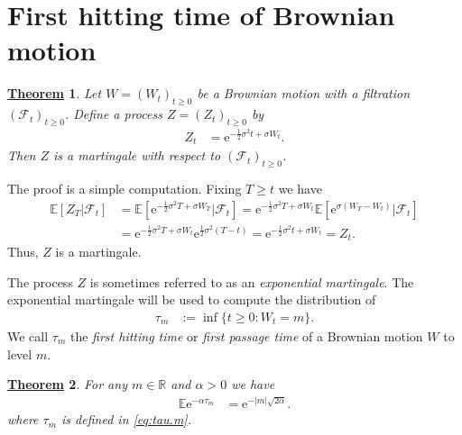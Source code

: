 \documentclass[12pt]{book}
\numberwithin{equation}{chapter}
\theoremstyle{plain}
\newtheorem{theorem}{\underline{Theorem}}
\numberwithin{theorem}{section}
\theoremstyle{definition}
\numberwithin{exercise}{chapter}
\let\oldendproof\endproof
\renewenvironment{proof}[1][\proofname]{%
  \oldproof[\scshape\underline{#1}]%
}{\oldendproof}
\newcommand{\<}{\langle}
\renewcommand{\>}{\rangle}
\renewcommand{\(}{\left(}
\renewcommand{\)}{\right)}
\renewcommand{\[}{\left[}
\renewcommand{\]}{\right]}
\newcommand\Eb{\mathds{E}}
\newcommand\Rb{\mathds{R}}
\newcommand\Fc{\mathscr{F}}
\newcommand\sig{\sigma}
\newcommand\ee{\mathrm{e}}
\begin{document}

\section{First hitting time of Brownian motion}
\label{sec:hitting.bm}

\begin{theorem}
Let $W=(W_t)_{t \geq 0}$ be a Brownian motion with a filtration $(\Fc_t)_{t \geq 0}$.  Define a process $Z=(Z_t)_{t \geq 0}$ by
\begin{align}
Z_t
	&=	\ee^{ -\tfrac{1}{2} \sig^2 t + \sig W_t } . \label{eq:exp.martingale}
\end{align}
Then $Z$ is a martingale with respect to $(\Fc_t)_{t \geq 0}$.
\end{theorem}

\begin{proof}
The proof is a simple computation.  Fixing $T \geq t$ we have
\begin{align}
\Eb[ Z_T | \Fc_t ]
	&=	\Eb[ \ee^{ -\tfrac{1}{2} \sig^2 T + \sig W_T }| \Fc_t ] 
	=		\ee^{ -\tfrac{1}{2} \sig^2 T + \sig W_t }\Eb[ \ee^{ \sig ( W_T - W_t ) }| \Fc_t ] \\
	&=	\ee^{ -\tfrac{1}{2} \sig^2 T + \sig W_t } \ee^{ \tfrac{1}{2} \sig^2 ( T - t ) } 
	=		\ee^{ -\tfrac{1}{2} \sig^2 t + \sig W_t }
	=		Z_t .
\end{align}
Thus, $Z$ is a martingale.
\end{proof}

\noindent
The process $Z$ is sometimes referred to as an \emph{exponential martingale}.  The exponential martingale will be used to compute the distribution of 
\begin{align}
\tau_m
	&:=	\inf\{ t \geq 0 : W_t = m \} . \label{eq:tau.m}
\end{align}
We call $\tau_m$ the \emph{first hitting time} or \emph{first passage time} of a Brownian motion $W$ to level $m$.  

\begin{theorem}
For any $m \in \Rb$ and $\alpha > 0$ we have
\begin{align}
\Eb \ee^{- \alpha \tau_m}
	&=	\ee^{- |m|\sqrt{2 \alpha} } . \label{eq:laplace.tau.m}
\end{align}
where $\tau_m$ is defined in \eqref{eq:tau.m}.
\end{theorem}
\end{document}

